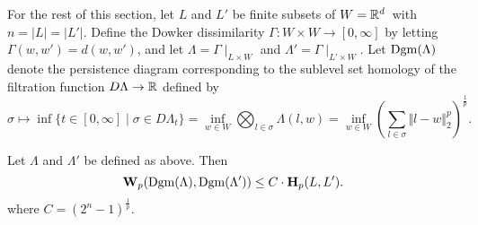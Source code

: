 	For the rest of this section, let $L$ and $L'$ be finite subsets of $W=\mathbb{R}^d$ with $n=|L|=|L'|$. Define the Dowker dissimilarity $\Gamma\colon W\times W\to [0,\infty]$ by letting $\Gamma(w,w')=d(w,w')$, and let $\Lambda=\Gamma\mid_{L\times W}$ and $\Lambda'=\Gamma\mid_{L'\times W}$. Let $\operatorname{Dgm}(\Lambda)$ denote the persistence diagram corresponding to the sublevel set homology of the filtration function $D\Lambda\to\mathbb{R}$ defined by 
	\begin{equation}\label{eq:filtration_function}
		\sigma\mapsto \inf\{t\in[0,\infty]\mid\sigma\in D\Lambda_t\} = \inf_{w\in W}\bigotimes_{l\in\sigma}\Lambda(l,w)=\inf_{w\in W}\left(\sum_{l\in\sigma}\Vert l-w\Vert_2^p\right)^{\frac{1}{p}}.
	\end{equation}

	\begin{cor}
		Let $\Lambda$ and $\Lambda'$ be defined as above. Then
		$$
			\textbf{W}_p(\operatorname{Dgm}(\Lambda), \operatorname{Dgm}(\Lambda'))\leq C\cdot\textbf{H}_p(L,L').
		$$
		where $C=(2^n-1)^{\frac{1}{p}}$.
	\end{cor}


